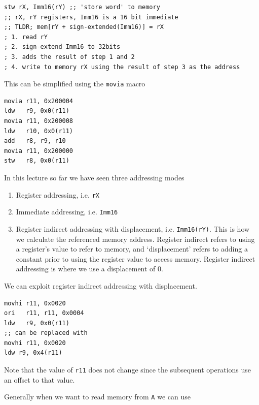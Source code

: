 \documentclass[10pt]{article}
\begin{document}
\begin{listing}[H]
\begin{verbatim}
stw rX, Imm16(rY) ;; 'store word' to memory
;; rX, rY registers, Imm16 is a 16 bit immediate
;; TLDR; mem[rY + sign-extended(Imm16)] = rX
; 1. read rY
; 2. sign-extend Imm16 to 32bits
; 3. adds the result of step 1 and 2
; 4. write to memory rX using the result of step 3 as the address
\end{verbatim}
\end{listing}

This can be simplified using the \texttt{movia} macro

\begin{listing}[H]
\begin{verbatim}
movia r11, 0x200004
ldw   r9, 0x0(r11)
movia r11, 0x200008
ldw   r10, 0x0(r11)
add   r8, r9, r10
movia r11, 0x200000
stw   r8, 0x0(r11)
\end{verbatim}
\end{listing}


In this lecture so far we have seen three addressing modes

\begin{enumerate}
	\item Register addressing, i.e. \texttt{rX} 
	\item Immediate addressing, i.e. \texttt{Imm16}
	\item Register indirect addressing with displacement, i.e. \texttt{Imm16(rY)}. This is how we calculate the referenced memory address. Register indirect refers to using a register's value to refer to memory, and `displacement' refers to adding a constant prior to using the register value to access memory. Register indirect addressing is where we use a displacement of 0.
\end{enumerate}


We can exploit register indirect addressing with displacement.

\begin{listing}[H]
\begin{verbatim}
movhi r11, 0x0020
ori   r11, r11, 0x0004
ldw   r9, 0x0(r11)
;; can be replaced with
movhi r11, 0x0020
ldw r9, 0x4(r11)
\end{verbatim}
\end{listing}

Note that the value of \texttt{r11} does not change since the subsequent operations use an offset to that value.

Generally when we want to read memory from \texttt{A} we can use
\end{document}
